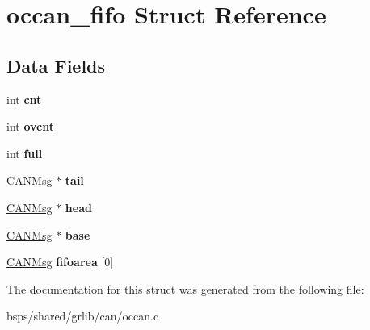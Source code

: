 \hypertarget{structoccan__fifo}{}\section{occan\+\_\+fifo Struct Reference}
\label{structoccan__fifo}
\subsection*{Data Fields}
\begin{DoxyCompactItemize}
\item 
\mbox{\label{structoccan__fifo_a392b3ca98f6847cd4e58309a8c90fafc}} 
int {\bfseries cnt}
\item 
\mbox{\label{structoccan__fifo_ad95d0b83863c89820af08de993c630f7}} 
int {\bfseries ovcnt}
\item 
\mbox{\label{structoccan__fifo_a5c5ba890699d947b5c1e26a9634f6012}} 
int {\bfseries full}
\item 
\mbox{\label{structoccan__fifo_a11caa0eac50a5412938587686de16c57}} 
\mbox{\hyperlink{structCANMsg}{C\+A\+N\+Msg}} $\ast$ {\bfseries tail}
\item 
\mbox{\label{structoccan__fifo_a93a676917983923c417f30a2e5776118}} 
\mbox{\hyperlink{structCANMsg}{C\+A\+N\+Msg}} $\ast$ {\bfseries head}
\item 
\mbox{\label{structoccan__fifo_a5bb8280e285170615191812246af851c}} 
\mbox{\hyperlink{structCANMsg}{C\+A\+N\+Msg}} $\ast$ {\bfseries base}
\item 
\mbox{\label{structoccan__fifo_a06c5df73ddd5d288f68f98e17f935309}} 
\mbox{\hyperlink{structCANMsg}{C\+A\+N\+Msg}} {\bfseries fifoarea} \mbox{[}0\mbox{]}
\end{DoxyCompactItemize}


The documentation for this struct was generated from the following file\+:\begin{DoxyCompactItemize}
\item 
bsps/shared/grlib/can/occan.\+c\end{DoxyCompactItemize}
